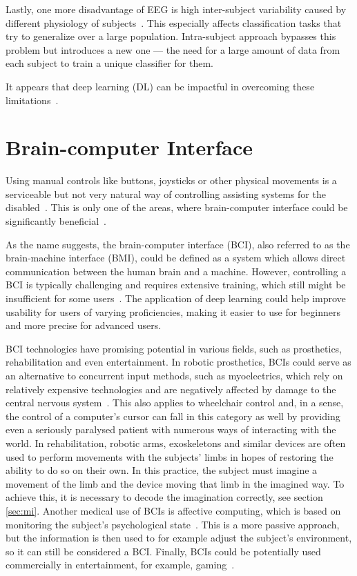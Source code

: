 \documentclass[english, he, bc, kiv, iso690alph, viewonly]{fasthesis}
\begin{document}
Lastly, one more disadvantage of EEG is high inter-subject variability caused by different physiology of subjects~\cite{roy:eeg:review:19}. This especially affects classification tasks that try to generalize over a large population. Intra-subject approach bypasses this problem but introduces a new one --- the need for a large amount of data from each subject to train a unique classifier for them.

It appears that deep learning (DL) can be impactful in overcoming these limitations~\cite{roy:eeg:review:19}.

\section{Brain-computer Interface}
\label{sec:bci}

Using manual controls like buttons, joysticks or other physical movements is a serviceable but not very natural way of controlling assisting systems for the disabled~\cite{he:bci:legs:18}. This is only one of the areas, where brain-computer interface could be significantly beneficial~\cite{craik:dl:eeg:rev:19}.

As the name suggests, the brain-computer interface (BCI), also referred to as the brain-machine interface (BMI), could be defined as a system which allows direct communication between the human brain and a machine. However, controlling a BCI is typically challenging and requires extensive training, which still might be insufficient for some users~\cite{data:stieger:21}. The application of deep learning could help improve usability for users of varying proficiencies, making it easier to use for beginners and more precise for advanced users.

BCI technologies have promising potential in various fields, such as prosthetics, rehabilitation and even entertainment.
In robotic prosthetics, BCIs could serve as an alternative to concurrent input methods, such as myoelectrics, which rely on relatively expensive technologies and are negatively affected by damage to the central nervous system~\cite{padfield:bci:19}. This also applies to wheelchair control and, in a sense, the control of a computer's cursor can fall in this category as well by providing even a seriously paralysed patient with numerous ways of interacting with the world.
In rehabilitation, robotic arms, exoskeletons and similar devices are often used to perform movements with the subjects' limbs in hopes of restoring the ability to do so on their own. In this practice, the subject must imagine a movement of the limb and the device moving that limb in the imagined way. To achieve this, it is necessary to decode the imagination correctly, see section \ref{sec:mi}.
Another medical use of BCIs is affective computing, which is based on monitoring the subject's psychological state~\cite{padfield:bci:19}. This is a more passive approach, but the information is then used to for example adjust the subject's environment, so it can still be considered a BCI.
Finally, BCIs could be potentially used commercially in entertainment, for example, gaming~\cite{padfield:bci:19}.
\end{document}
